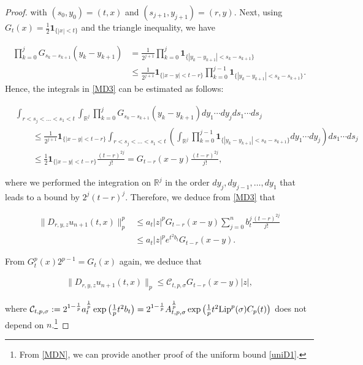 \documentclass[letterpaper, 11pt,  reqno]{amsart}
\newcommand{\noi}{\noindent}
\newcommand{\R}{\mathbb{R}}
\newcommand{\s}{\sigma}
\newcommand{\ind}{\mathbf 1}
\newcommand{\Lip}{\textup{Lip}}
\numberwithin{equation}{section}
\numberwithin{theorem}{section}
\begin{document}
\begin{proof}
\noi
with $(s_0, y_0) = (t, x)$ and $(s_{j+1}, y_{j+1}) = (r, y)$.
Next, using   $G_t(x) = \frac{1}{2}\ind_{\{ |x| < t \}}$ 
and    the triangle inequality, we have

\noi
\begin{align*}
 \prod_{k=0}^{j} G_{s_k-s_{k+1}}(y_k-y_{k+1})
 & =\frac{1}{2^{j+1}}\prod_{k=0}^{j}\ind_{\{ |y_k-y_{k+1} |< s_k-s_{k+1}\}} \\
 &\leq \frac{1}{2^{j+1}}
\ind_{ \{ |x-y| < t -r  \}}
\prod_{k=0}^{j-1}  \ind_{\{ |y_k-y_{k+1} |<  s_k-s_{k+1}  \}}.
\end{align*}
Hence, the integrals in \eqref{MD3} can be estimated as follows:

\noi
\begin{align*}
& \int_{r< s_j  < \ldots < s_1 < t }
\int_{\R^j} 
\prod_{k=0}^j  G_{s_k-s_{k+1}}(y_k-y_{k+1}) dy_1\cdots dy_j   ds_1 \cdots ds_j \\ %
&\qquad \leq   \frac{1}{2^{j+1}} \ind_{ \{ |x-y| < t -r  \}}
\int_{r< s_j <\ldots < s_1 < t } 
\left(\int_{\R^j}  \prod_{k=0}^{j-1}  \ind_{\{ |y_k-y_{k+1} |<  s_k-s_{k+1}   \}} 
  dy_1\cdots dy_j \right) ds_1 \cdots ds_j  \\
&\qquad \leq   \frac{1}{2}  \ind_{ \{ |x-y| < t -r  \}}  \frac{(t-r)^{2j}}{ j!} 
                =G_{t-r}(x-y) \frac{ (t-r)^{2j}}{j!} , 
\end{align*}

\noi
where we performed the integration on $\R^j$ in the order $dy_j, dy_{j-1}, \ldots, dy_1$
that leads to a bound by $2^j(t-r)^j$.
Therefore, we deduce from \eqref{MD3} that 


\noi
\begin{align*}
\| D_{r,y,z} u_{n+1}(t, x) \|^p_p 
&\leq a_t |z|^p G_{t-r}(x-y) 
\sum_{j=0}^{n}
b_t^j      \frac{ (t-r)^{2j}}{j!} \\
&\leq  a_t |z|^p  e^{ t^2 b_t} G_{t-r}(x-y) .
\end{align*}

\noi
From  $G_t^p(x)2^{p-1} =G_t(x)$ again,  we deduce that 


\noi
\begin{align}\label{MDN}
\| D_{r,y,z} u_{n+1}(t, x) \|_p 
\leq \mathcal{C}_{t,p, \s} G_{t-r}(x-y)|z|,
\end{align}

\noi
where 
$\mathcal{C}_{t,p, \s} := 2^{1-\frac{1}{p}}  a_{t}^{\frac1p} \exp\big(  \frac{1}{p}t^2 b_t \big) 
= 2^{1-\frac{1}{p}}  A_{t, p,  \s}^{\frac1p}  \exp\big(  \frac{1}{p}t^2 \Lip^p(\s) C_p(t) \big) $  
does not depend on $n$.\footnote{From \eqref{MDN}, we can provide another proof of
the uniform bound \eqref{uniD1}.}



\end{proof}
\end{document}
